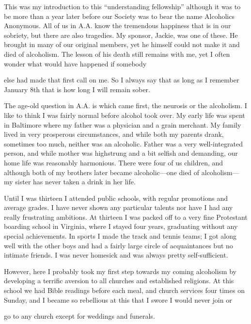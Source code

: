 \begin{biblechapter}
This was my introduction to this “understanding fellowship” although it was to be more than a year later before our Society was to bear the name Alcoholics Anonymous. All of us in A.A. know the tremendous happiness that is in our sobriety, but there are also tragedies. My sponsor, Jackie, was one of these. He brought in many of our original members, yet he himself could not make it and died of alcoholism. The lesson of his death still remains with me, yet I often wonder what would have happened if somebody

else had made that first call on me. So I always say that as long as I remember January 8th that is how long I will remain sober.

The age-old question in A.A. is which came first, the neurosis or the alcoholism. I like to think I was fairly normal before alcohol took over. My early life was spent in Baltimore where my father was a physician and a grain merchant. My family lived in very prosperous circumstances, and while both my parents drank, sometimes too much, neither was an alcoholic. Father was a very well-integrated person, and while mother was highstrung and a bit selfish and demanding, our home life was reasonably harmonious. There were four of us children, and although both of my brothers later became alcoholic—one died of alcoholism—my sister has never taken a drink in her life.

Until I was thirteen I attended public schools, with regular promotions and average grades. I have never shown any particular talents nor have I had any really frustrating ambitions. At thirteen I was packed off to a very fine Protestant boarding school in Virginia, where I stayed four years, graduating without any special achievements. In sports I made the track and tennis teams; I got along well with the other boys and had a fairly large circle of acquaintances but no intimate friends. I was never homesick and was always pretty self-sufficient.

However, here I probably took my first step towards my coming alcoholism by developing a terrific aversion to all churches and established religions. At this school we had Bible readings before each meal, and church services four times on Sunday, and I became so rebellious at this that I swore I would never join or

go to any church except for weddings and funerals.


\end{biblechapter}
